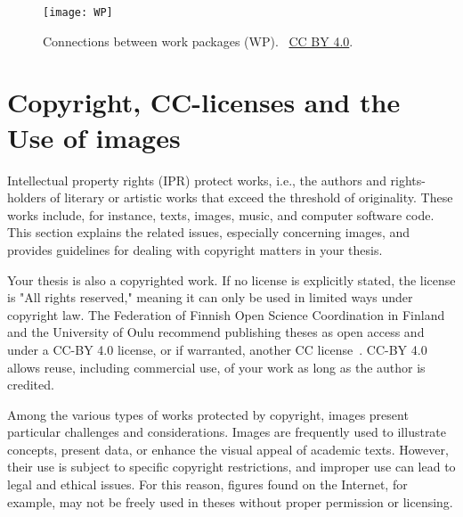 \begin{figure}[ht]
  \begin{center}
    \texttt{[image: WP]}
  \end{center}
  \caption{Connections between work packages (WP). \copyrightstring\ \href{https://creativecommons.org/licenses/by/4.0/}{CC BY 4.0}.}
  \label{fig:work_packages}
\end{figure}

\section{Copyright, CC-licenses and the Use of images}
\label{copyright}
Intellectual property rights (IPR) protect works, i.e., the authors
and rights-holders of literary or artistic works that exceed the
threshold of originality. These works include, for instance, texts,
images, music, and computer software code. This section explains the
related issues, especially concerning images, and provides guidelines
for dealing with copyright matters in your thesis.

Your thesis is also a copyrighted work. If no license is explicitly
stated, the license is "All rights reserved," meaning it can only be
used in limited ways under copyright law. The Federation of Finnish
Open Science Coordination in Finland and the University of Oulu
recommend publishing theses as open access and under a CC-BY 4.0 license,
or if warranted, another CC license~\cite{coordination_open_2024}.
CC-BY 4.0 allows reuse, including commercial use, of your work as long as
the author is credited.

Among the various types of works protected by copyright, images
present particular challenges and considerations. Images are
frequently used to illustrate concepts, present data, or enhance the
visual appeal of academic texts. However, their use is subject to
specific copyright restrictions, and improper use can lead to legal
and ethical issues.  For this reason, figures found on the Internet,
for example, may not be freely used in theses without proper
permission or licensing.

